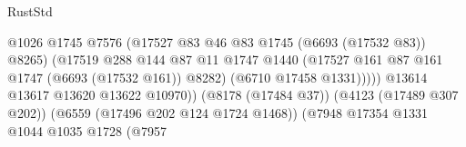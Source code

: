 \begin{lexlean}{RustStd}
\begin{coremodule}
                                                          @1026
                                                          @1745
                                                          @7576
                                                          (@17527
                                                            @83
                                                            @46
                                                            @83
                                                            @1745
                                                            (@6693 (@17532 @83))
                                                            @8265)
                                                          (@17519
                                                            @288
                                                            @144
                                                            @87
                                                            @11
                                                            @1747
                                                            @1440
                                                            (@17527
                                                              @161
                                                              @87
                                                              @161
                                                              @1747
                                                              (@6693 (@17532 @161))
                                                              @8282)
                                                            (@6710 @17458 @1331)))))
                                                    @13614
                                                    @13617
                                                    @13620
                                                    @13622
                                                    @10970))
                                                (@8178 (@17484 @37))
                                                (@4123 (@17489 @307 @202))
                                                (@6559 (@17496 @202 @124 @1724 @1468))
                                                (@7948
                                                  @17354
                                                  @1331
                                                  @1044
                                                  @1035
                                                  @1728
                                                  (@7957

\end{coremodule}
\end{lexlean}
